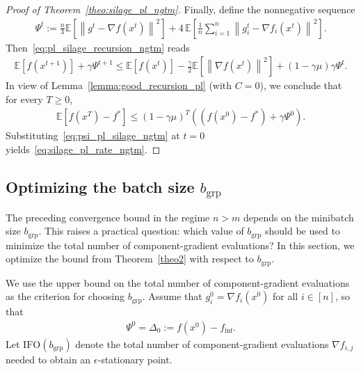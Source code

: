 \documentclass{article}
\newcommand{\bb}{\mathbb}
\newcommand{\sqn}[1]{\left\| #1 \right\|^2}
\newcommand{\finf}{f_\mathrm{inf}}
\newcommand{\fstar}{f^*}
\newcommand{\eqdef}{:=}
\newcommand{\Exp}[1]{{\bb E}\left[#1\right]}
\theoremstyle{plain}
\begin{document}
\begin{proof}[Proof of Theorem~\ref{theo:silage_pl_ngtm}]
Finally, define the nonnegative sequence
\begin{align}
\label{eq:psi_pl_silage_ngtm}
\Psi^t \eqdef \frac{n}{3}\Exp{\sqn{g^{t}-\nabla f(x^{t})}}
+ 4\,\Exp{\frac{1}{n}\sum_{i=1}^n\sqn{g_i^{t}-\nabla f_i(x^{t})}}.
\end{align}
Then~\eqref{eq:pl_silage_recursion_ngtm} reads
\begin{align*}
\Exp{f(x^{t+1})} + \gamma \Psi^{t+1}
\leq \Exp{f(x^{t})} -\frac{\gamma}{2}\Exp{\sqn{\nabla f(x^t)}} + (1-\gamma\mu)\gamma \Psi^{t}.
\end{align*}
In view of Lemma~\ref{lemma:good_recursion_pl} (with $C=0$), we conclude that for every $T\geq 0$,
\begin{align*}
\Exp{f(x^{T})-\fstar} \leq (1-\gamma\mu)^{T}\left((f(x^0)-\fstar)+\gamma\Psi^0\right).
\end{align*}
Substituting~\eqref{eq:psi_pl_silage_ngtm} at $t=0$ yields~\eqref{eq:silage_pl_rate_ngtm}.
\end{proof}


\subsection{Optimizing the batch size $b_{\mathrm{grp}}$}\label{sec:app-opt-bgrp}
The preceding convergence bound in the regime $n>m$ depends on the minibatch size $b_{\mathrm{grp}}$.
This raises a practical question: which value of $b_{\mathrm{grp}}$ should be used to minimize the total number of component-gradient evaluations?
In this section, we optimize the bound from Theorem~\ref{theo2} with respect to $b_{\mathrm{grp}}$.

We use the upper bound on the total number of component-gradient evaluations as the criterion for choosing $b_{\mathrm{grp}}$.
Assume that $g_i^0=\nabla f_i(x^0)$ for all $i\in[n]$, so that
\begin{align*}
\Psi^0=\Delta_0 \eqdef f(x^0)-\finf.
\end{align*}
Let $\mathrm{IFO}(b_{\mathrm{grp}})$ denote the total number of component-gradient evaluations $\nabla f_{i,j}$ needed to obtain an $\epsilon$-stationary point.
\end{document}
